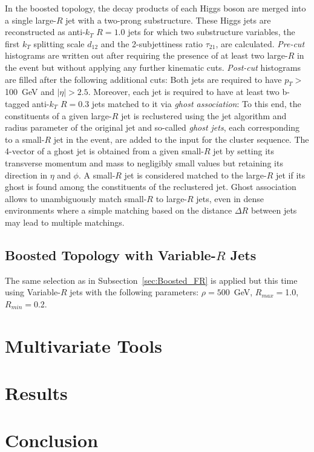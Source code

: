 \documentclass[12pt]{article}
\begin{document}
In the boosted topology, the decay products of each Higgs boson are merged into a single large-$R$ jet with a two-prong substructure. 
These Higgs jets are reconstructed as anti-$k_T$ $R=1.0$ jets for which two substructure variables, the first $k_T$ splitting scale $d_{12}$
and the 2-subjettiness ratio $\tau_{21}$, are calculated.
\textit{Pre-cut} histograms are written out after requiring the presence of at least two large-$R$ in the event but without applying any further
kinematic cuts. \textit{Post-cut} histograms are filled after the following additional cuts: 
Both jets are required to have $p_T >$100~GeV and $|\eta|>2.5$. Moreover, each jet is required to have at least two b-tagged anti-$k_T$ $R=0.3$ 
jets matched to it via \textit{ghost association}: 
To this end, the constituents of a given large-$R$ jet is reclustered using the jet algorithm 
and radius parameter of the original jet and so-called \textit{ghost jets}, each corresponding to a small-$R$ jet in the event, 
are added to the input for the cluster sequence. The 4-vector of a ghost jet is obtained from a given small-$R$ jet 
by setting its transverse momentum and mass to negligibly small values but retaining its direction in $\eta$ and $\phi$. A small-$R$ jet is 
considered matched to the large-$R$ jet if its ghost is found among the constituents of the reclustered jet. Ghost association allows to unambiguously
match small-$R$ to large-$R$ jets, even in dense environments where a simple matching based on the distance $\Delta R$ between jets 
may lead to multiple matchings.

\subsection{Boosted Topology with Variable-$R$ Jets}

The same selection as in Subsection~\ref{sec:Boosted_FR} is applied but this time using Variable-$R$ jets with the following parameters:
$\rho=500$~GeV, $R_{max}=$1.0, $R_{min}=$0.2.

\section{Multivariate Tools}

\section{Results}

\section{Conclusion}
\end{document}
